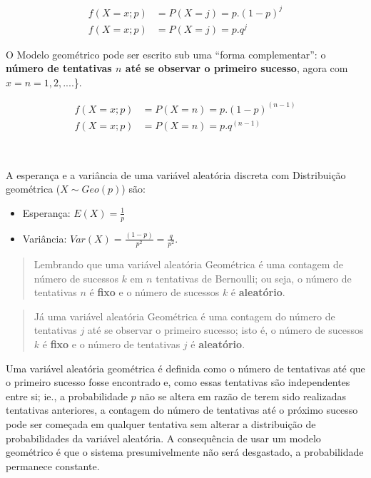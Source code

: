 \documentclass[
]{book}
\providecommand{\tightlist}{%
  \setlength{\itemsep}{0pt}\setlength{\parskip}{0pt}}
\begin{document}
\begin{align*}
f(X=x; p) & = P(X=j) = p . (1-p)^{j} \\
f(X=x; p) & = P(X=j) = p . q^{j}
\end{align*}

\hfill\break

O Modelo geométrico pode ser escrito sub uma ``forma complementar'': o \textbf{número de tentativas \(n\) até se observar o primeiro sucesso}, agora com \(x=n=1, 2, ...\).\}.

\hfill\break

\begin{align*}
f(X=x; p) & = P(X=n) = p . (1-p)^{(n-1)} \\
f(X=x; p) & = P(X=n) = p . q^{(n-1)}  
\end{align*}

~

A esperança e a variância de uma variável aleatória discreta com Distribuição geométrica (\(X\sim Geo(p)\)) são:

\hfill\break

\begin{itemize}
\tightlist
\item
  Esperança: \(E(X) = \frac{1}{p}\)\\
\item
  Variância: \(Var(X) = \frac{(1-p)}{p^{2}} = \frac{q}{p^{2}}\).
\end{itemize}

\hfill\break

\begin{quote}
Lembrando que uma variável aleatória Geométrica é uma contagem de número de sucessos \(k\) em \(n\) tentativas de Bernoulli; ou seja, o número de tentativas \(n\) é \textbf{fixo} e o número de sucessos \(k\) é \textbf{aleatório}.
\end{quote}

\hfill\break

\begin{quote}
Já uma variável aleatória Geométrica é uma contagem do número de tentativas \(j\) até se observar o primeiro sucesso; isto é, o número de sucessos \(k\) é \textbf{fixo} e o número de tentativas \(j\) é \textbf{aleatório}.
\end{quote}

\hfill\break

Uma variável aleatória geométrica é definida como o número de tentativas até que o primeiro sucesso fosse encontrado e, como essas tentativas são independentes entre si; ie., a probabilidade \(p\) não se altera em razão de terem sido realizadas tentativas anteriores, a contagem do número de tentativas até o próximo sucesso pode ser começada em qualquer tentativa sem alterar a distribuição de probabilidades da variável aleatória. A consequência de usar um modelo geométrico é que o sistema presumivelmente não será desgastado, a probabilidade permanece constante.
\end{document}
